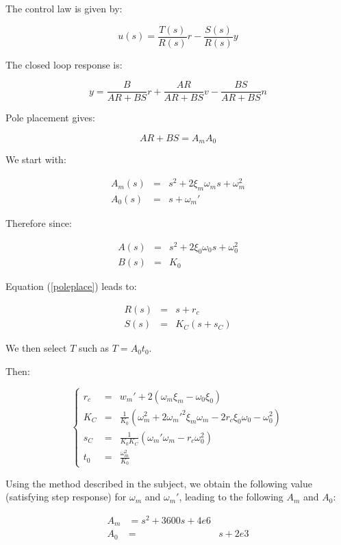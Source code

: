 The control law is given by:

$$u(s) = \frac{T(s)}{R(s)} r - \frac{S(s)}{R(s)}y$$

The closed loop response is:

$$y = \frac{B}{AR+BS} r + \frac{AR}{AR+BS}v - \frac{BS}{AR+BS}n$$

Pole placement gives:

\begin{equation} AR + BS = A_m A_0 \label{poleplace} \end{equation}

We start with:

$$
\begin{array}{rcl} A_m(s) & = &  s^2 + 2 \xi_m \omega_m s + \omega_m^2 \\ A_0(s) & = & s + \omega_m' \end{array} 
$$

Therefore since:

$$\begin{array}{rcl} A(s) & =&  s^2 + 2 \xi_0 \omega_0 s + \omega_0^2 \\ B(s) & = & K_0 \end{array}$$

Equation (\ref{poleplace}) leads to:

$$\begin{array}{rcl} R(s) & =&  s+r_c \\ S(s) & = & K_C(s+s_C) \end{array}$$

We then select $T$ such as $T = A_0 t_0$.

Then:

$$\left\{\begin{array}{rcl} 
r_c & = & w_m' + 2(\omega_m \xi_m -\omega_0 \xi_0)  \\
K_C & = & \frac{1}{K_0} \left(\omega_m^2 + 2 \omega_m'^2 \xi_m \omega_m - 2 r_c \xi_0 \omega_0 - \omega_0^2\right) \\
s_C & = & \frac{1}{K_0 K_C}(\omega_m' \omega_m - r_c \omega_0^2) \\
t_0 & = & \frac{\omega_m^2}{K_0}
\end{array}\right.$$


Using the method described in the subject, we obtain the following value (satisfying step response) for $\omega_m$ and $\omega_m'$, leading to the following $A_m$ and $A_0$:

$$\begin{array}{rcl}
   A_m & = s^2 + 3600s + 4e6& \\
   A_0 & = & s+2e3\\
  \end{array}$$
  

